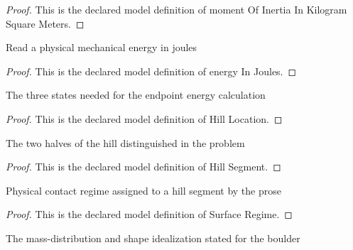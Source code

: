 \begin{proof}
  This is the declared model definition of moment Of Inertia In Kilogram Square Meters.
\end{proof}
\begin{definition}
  \label{def:physics:phyx-mini-0789:phyxminiproblems-problemphyxmini0789-energyinjoules}
  Read a physical mechanical energy in joules
\end{definition}
\begin{proof}
  This is the declared model definition of energy In Joules.
\end{proof}
\begin{definition}
  \label{def:physics:phyx-mini-0789:phyxminiproblems-problemphyxmini0789-hilllocation}
  The three states needed for the endpoint energy calculation
\end{definition}
\begin{proof}
  This is the declared model definition of Hill Location.
\end{proof}
\begin{definition}
  \label{def:physics:phyx-mini-0789:phyxminiproblems-problemphyxmini0789-hillsegment}
  The two halves of the hill distinguished in the problem
\end{definition}
\begin{proof}
  This is the declared model definition of Hill Segment.
\end{proof}
\begin{definition}
  \label{def:physics:phyx-mini-0789:phyxminiproblems-problemphyxmini0789-surfaceregime}
  Physical contact regime assigned to a hill segment by the prose
\end{definition}
\begin{proof}
  This is the declared model definition of Surface Regime.
\end{proof}
\begin{definition}
  \label{def:physics:phyx-mini-0789:phyxminiproblems-problemphyxmini0789-bouldermodel}
  The mass-distribution and shape idealization stated for the boulder
\end{definition}
